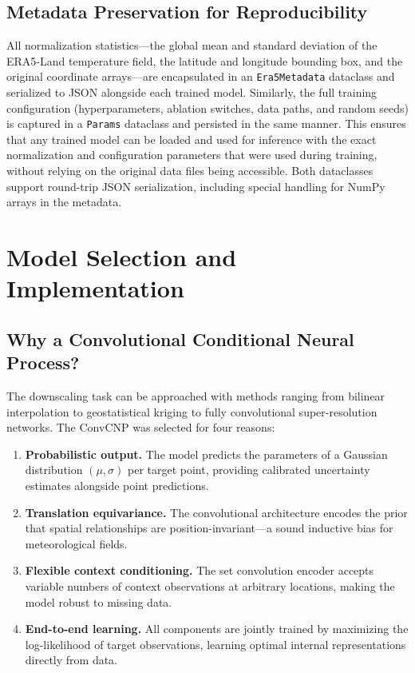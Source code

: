 \subsection{Metadata Preservation for Reproducibility}

All normalization statistics---the global mean and standard deviation of the ERA5-Land temperature field, the latitude and longitude bounding box, and the original coordinate arrays---are encapsulated in an \texttt{Era5Metadata} dataclass and serialized to JSON alongside each trained model. Similarly, the full training configuration (hyperparameters, ablation switches, data paths, and random seeds) is captured in a \texttt{Params} dataclass and persisted in the same manner. This ensures that any trained model can be loaded and used for inference with the exact normalization and configuration parameters that were used during training, without relying on the original data files being accessible. Both dataclasses support round-trip JSON serialization, including special handling for NumPy arrays in the metadata.

\section{Model Selection and Implementation}

\subsection{Why a Convolutional Conditional Neural Process?}

The downscaling task can be approached with methods ranging from bilinear interpolation to geostatistical kriging to fully convolutional super-resolution networks. The ConvCNP was selected for four reasons:

\begin{enumerate}
    \item \textbf{Probabilistic output.} The model predicts the parameters of a Gaussian distribution $(\mu, \sigma)$ per target point, providing calibrated uncertainty estimates alongside point predictions.
    \item \textbf{Translation equivariance.} The convolutional architecture encodes the prior that spatial relationships are position-invariant---a sound inductive bias for meteorological fields.
    \item \textbf{Flexible context conditioning.} The set convolution encoder accepts variable numbers of context observations at arbitrary locations, making the model robust to missing data.
    \item \textbf{End-to-end learning.} All components are jointly trained by maximizing the log-likelihood of target observations, learning optimal internal representations directly from data.
\end{enumerate}

